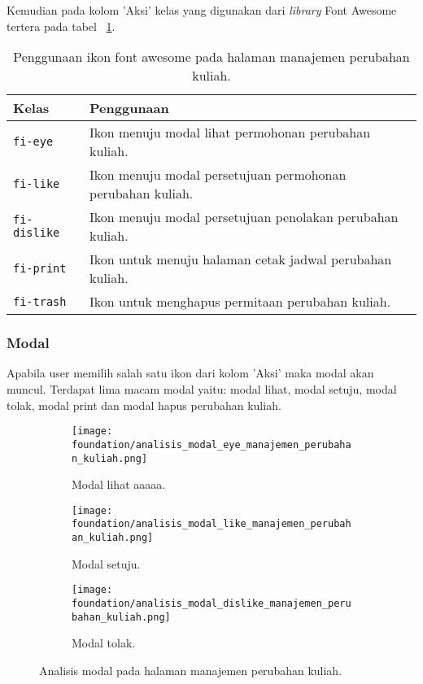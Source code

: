Kemudian pada kolom 'Aksi' kelas yang digunakan dari \textit{library} Font Awesome tertera pada tabel ~\ref{table:analisisIkonManajemenPerubahanKuliah}.
\begin{table}[H]
	\centering
	\caption{Penggunaan ikon font awesome pada halaman manajemen perubahan kuliah.}
	\begin{tabularx}{\textwidth}{lX}
		\toprule
		Kelas     & Penggunaan \\
		\midrule
		\texttt{fi-eye} & Ikon menuju modal lihat permohonan perubahan kuliah.\\
		\texttt{fi-like} & Ikon menuju modal persetujuan permohonan perubahan kuliah.\\
		\texttt{fi-dislike} & Ikon menuju modal persetujuan penolakan perubahan kuliah.\\
		\texttt{fi-print} & Ikon untuk menuju halaman cetak jadwal perubahan kuliah.\\
		\texttt{fi-trash} & Ikon untuk menghapus permitaan perubahan kuliah.\\
		\bottomrule
	\end{tabularx}%
	\label{table:analisisIkonManajemenPerubahanKuliah}
\end{table}

\subsubsection{Modal}
Apabila user memilih salah satu ikon dari kolom 'Aksi' maka modal akan muncul. Terdapat lima macam modal yaitu: modal lihat, modal setuju, modal tolak, modal print dan modal hapus perubahan kuliah. 
\begin{figure} [H]	
	\centering
	\begin{subfigure}[b]{0.6\linewidth} 
		\texttt{[image: foundation/analisis\_modal\_eye\_manajemen\_perubahan\_kuliah.png]}
		\caption{Modal lihat aaaaa.}  
	\end{subfigure}	
	\begin{subfigure}[b]{0.6\linewidth}  
		\texttt{[image: foundation/analisis\_modal\_like\_manajemen\_perubahan\_kuliah.png]}
		\caption{Modal setuju.}
	\end{subfigure}
	\begin{subfigure}[b]{0.6\linewidth}
		\texttt{[image: foundation/analisis\_modal\_dislike\_manajemen\_perubahan\_kuliah.png]}
		\caption{Modal tolak.}  
	\end{subfigure}
\caption{Analisis modal pada halaman manajemen perubahan kuliah.}

\end{figure}

